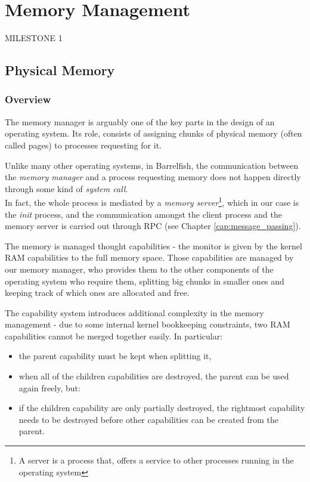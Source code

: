 \documentclass[a4paper,twoside,openright]{report}
\begin{document}
\chapter{Memory Management}
MILESTONE 1
\section{Physical Memory}
\subsection{Overview}
The memory manager is arguably one of the key parts in the design of an operating system.
Its role, consists of assigning chunks of physical memory (often called pages) to processes requesting for it.

Unlike many other operating systems, in Barrelfish, the communication between the \emph{memory manager} and a process requesting memory does not happen directly through some kind of \emph{system call}.\\
In fact, the whole process is mediated by a \emph{memory server}\footnote{A server is a process that, offers a service to other processes running in the operating system}, which in our case is the \emph{init} process, and the communication amongst the client process and the memory server is carried out through RPC (see Chapter \ref{cap:message_passing}).

The memory is managed thought capabilities - the monitor is given by the kernel RAM capabilities to the full memory space. Those capabilities are managed by our memory manager, who provides them to the other components of the operating system who require them, splitting big chunks in smaller ones and keeping track of which ones are allocated and free.

The capability system introduces additional complexity in the memory management - due to some internal kernel bookkeeping constraints, two RAM capabilities cannot be merged together easily. In particular:
\begin{itemize}
	\item the parent capability must be kept when splitting it,
	\item when all of the children capabilities are destroyed, the parent can be used again freely, but:
	\item if the children capability are only partially destroyed, the rightmost capability needs to be destroyed before other capabilities can be created from the parent.
\end{itemize}
\end{document}
